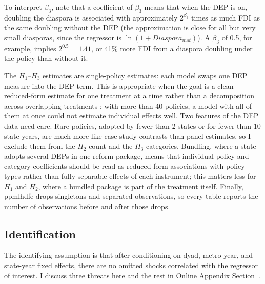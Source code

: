 \documentclass[12pt]{article}
\begin{document}
To interpret $\beta_3$, note that a coefficient of $\beta_3$ means that when the DEP is on, doubling the diaspora is associated with approximately $2^{\beta_3}$ times as much FDI as the same doubling without the DEP (the approximation is close for all but very small diasporas, since the regressor is $\ln(1+Diaspora_{mst})$). A $\beta_3$ of 0.5, for example, implies $2^{0.5} = 1.41$, or 41\% more FDI from a diaspora doubling under the policy than without it.

The $H_1$--$H_3$ estimates are single-policy estimates: each model swaps one DEP measure into the DEP term. This is appropriate when the goal is a clean reduced-form estimate for one treatment at a time rather than a decomposition across overlapping treatments \citep{goldsmith-pinkham_estimating_2021}; with more than 40 policies, a model with all of them at once could not estimate individual effects well. Two features of the DEP data need care. Rare policies, adopted by fewer than 2 states or for fewer than 10 state-years, are much more like case-study contrasts than panel estimates, so I exclude them from the $H_2$ count and the $H_3$ categories. Bundling, where a state adopts several DEPs in one reform package, means that individual-policy and category coefficients should be read as reduced-form associations with policy types rather than fully separable effects of each instrument; this matters less for $H_1$ and $H_2$, where a bundled package is part of the treatment itself. Finally, ppmlhdfe drops singletons and separated observations, so every table reports the number of observations before and after those drops.

\subsection{Identification}

The identifying assumption is that after conditioning on dyad, metro-year, and state-year fixed effects, there are no omitted shocks correlated with the regressor of interest. I discuss three threats here and the rest in Online Appendix Section~.
\end{document}

